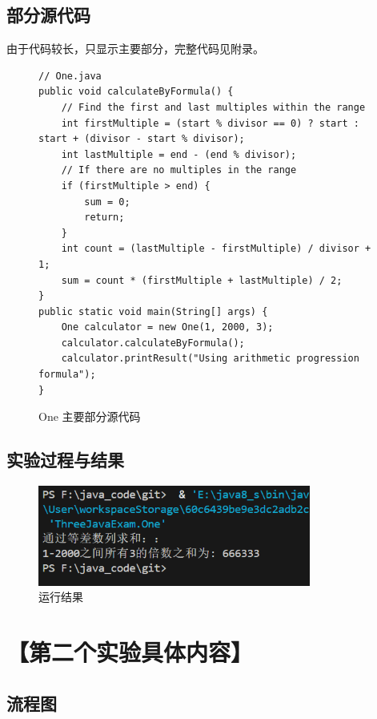 \documentclass[12pt,a4paper]{article}
\begin{document}
\subsection*{部分源代码}
由于代码较长，只显示主要部分，完整代码见附录。
\begin{figure}[H]
\centering
\begin{lstlisting}
// One.java
public void calculateByFormula() {
    // Find the first and last multiples within the range
    int firstMultiple = (start % divisor == 0) ? start : start + (divisor - start % divisor);
    int lastMultiple = end - (end % divisor);
    // If there are no multiples in the range
    if (firstMultiple > end) {
        sum = 0;
        return;
    }
    int count = (lastMultiple - firstMultiple) / divisor + 1;
    sum = count * (firstMultiple + lastMultiple) / 2;
}
public static void main(String[] args) {
    One calculator = new One(1, 2000, 3);
    calculator.calculateByFormula();
    calculator.printResult("Using arithmetic progression formula");
}
\end{lstlisting}
\caption{One 主要部分源代码}
\end{figure}

\subsection*{实验过程与结果}

\begin{figure}[H]
\centering
\includegraphics[width=0.8\textwidth]{one.png}
\caption{运行结果}
\end{figure}

\section*{【第二个实验具体内容】}

\subsection*{流程图}
\end{document}
